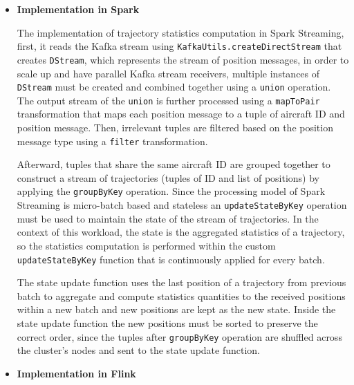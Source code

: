\documentclass[]{article}
\begin{document}
\begin{itemize}
\item {\bf{Implementation in Spark }}

\par The implementation of trajectory statistics computation in Spark Streaming, first, it reads the Kafka stream using \texttt{KafkaUtils.createDirectStream} that creates \texttt{DStream}, which represents the stream of position messages, in order to scale up and have parallel Kafka stream receivers, multiple instances of \texttt{DStream} must be created and combined together using a \texttt{union} operation. The output stream of the \texttt{union} is further processed using a \texttt{mapToPair} transformation that  maps each position message to a tuple of aircraft ID and position message. Then,  irrelevant tuples are filtered based on the position message type using  a \texttt{filter} transformation.\par Afterward, tuples that share the same aircraft ID are grouped together to construct a stream of trajectories (tuples of ID and list of positions) by applying the \texttt{groupByKey} operation. Since the processing  model of Spark Streaming is micro-batch based and stateless an \texttt{updateStateByKey} operation must be used to maintain the state of the stream of trajectories. In the context of this workload, the state is the aggregated statistics of a trajectory, so the statistics computation is performed within the custom \texttt{updateStateByKey} function that is continuously applied for every batch.
 \par The state update function uses the last position of a trajectory from previous batch to aggregate and compute statistics quantities to the received positions within a new batch and new positions are kept as the new state. Inside the state update function  the new positions must be sorted to preserve the correct order, since the tuples after \texttt{groupByKey} operation are shuffled across the cluster's  nodes and sent to the state update function.

\item {\bf{Implementation in Flink }}



\end{itemize}
\end{document}
